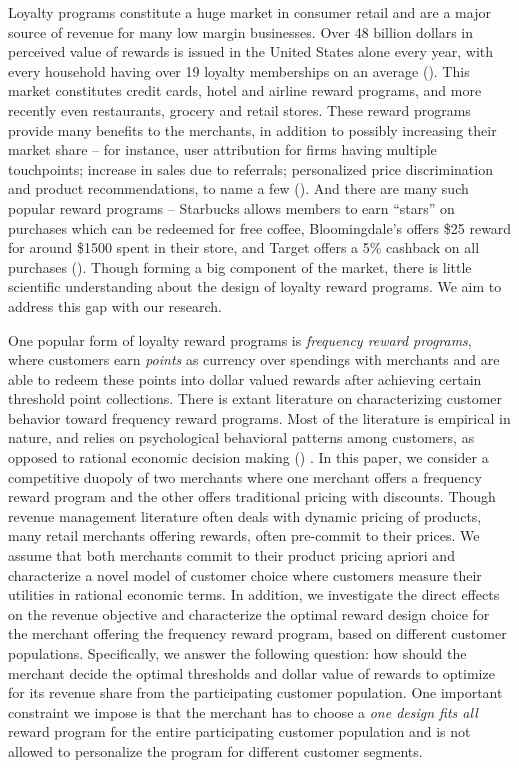 Loyalty programs constitute a huge market in consumer retail and are a major source of revenue for many low margin businesses.
Over 48 billion dollars in perceived value of rewards is issued in the United States alone every year, with every household having over 19 loyalty memberships on an average (\cite{berry2013loyalty}).
This market constitutes credit cards, hotel and airline reward programs, and more recently even restaurants, grocery and retail stores.
These reward programs provide many benefits to the merchants, in addition to possibly increasing their market share -- for instance, user attribution for firms having multiple touchpoints; increase in sales due to referrals; personalized price discrimination and product recommendations, to name a few (\cite{ryu2007penny}).
And there are many such popular reward programs -- Starbucks allows members to earn ``stars'' on purchases which can be redeemed for free coffee, Bloomingdale's offers \$25 reward for around \$1500 spent in their store, and Target offers a 5\% cashback on all purchases (\cite{cvs2015target}).
Though forming a big component of the market, there is little scientific understanding about the design of loyalty reward programs. We aim to address this gap with our research.

One popular form of loyalty reward programs is \emph{frequency reward programs}, where customers earn \emph{points} as currency over spendings with merchants and are able to redeem these points into dollar valued rewards after achieving certain threshold point collections.
There is extant literature on characterizing customer behavior toward frequency reward programs.
Most of the literature is empirical in nature, and relies on psychological behavioral patterns among customers, as opposed to rational economic decision making (\cite{kivetz2006goal,dreze2004using,gao2014influence}) .
In this paper, we consider a competitive duopoly of two merchants where one merchant offers a frequency reward program and the other offers traditional pricing with discounts.
Though revenue management literature often deals with dynamic pricing of products, many retail merchants offering rewards, often pre-commit to their prices. 
We assume that both merchants commit to their product pricing apriori and characterize a novel model of customer choice where customers measure their utilities in rational economic terms.
In addition, we investigate the direct effects on the revenue objective and characterize the optimal reward design choice for the merchant offering the frequency reward program, based on different customer populations.
Specifically, we answer the following question: how should the merchant decide the optimal thresholds and dollar value of rewards to optimize for its revenue share from the participating customer population.
One important constraint we impose is that the merchant has to choose a \emph{one design fits all} reward program for the entire participating customer population and is not allowed to personalize the program for different customer segments.

